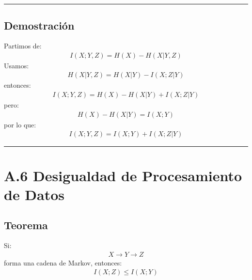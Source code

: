 \documentclass[letterpaper,10pt,english]{jupyterBook}
\begin{document}
\bigskip\hrule\bigskip



\subsection{Demostración}
\label{\detokenize{05_appendices/proofs:id8}}
\sphinxAtStartPar
Partimos de:
\begin{equation*}
\begin{split}
I(X;Y,Z)=H(X)-H(X|Y,Z)
\end{split}
\end{equation*}
\sphinxAtStartPar
Usamos:
\begin{equation*}
\begin{split}
H(X|Y,Z)=H(X|Y)-I(X;Z|Y)
\end{split}
\end{equation*}
\sphinxAtStartPar
entonces:
\begin{equation*}
\begin{split}
I(X;Y,Z)=
H(X)-H(X|Y)+I(X;Z|Y)
\end{split}
\end{equation*}
\sphinxAtStartPar
pero:
\begin{equation*}
\begin{split}
H(X)-H(X|Y)=I(X;Y)
\end{split}
\end{equation*}
\sphinxAtStartPar
por lo que:
\begin{equation*}
\begin{split}
I(X;Y,Z)=I(X;Y)+I(X;Z|Y)
\end{split}
\end{equation*}

\bigskip\hrule\bigskip



\section{A.6 Desigualdad de Procesamiento de Datos}
\label{\detokenize{05_appendices/proofs:a-6-desigualdad-de-procesamiento-de-datos}}

\subsection{Teorema}
\label{\detokenize{05_appendices/proofs:id9}}
\sphinxAtStartPar
Si:
\begin{equation*}
\begin{split}
X \rightarrow Y \rightarrow Z
\end{split}
\end{equation*}
\sphinxAtStartPar
forma una cadena de Markov, entonces:
\begin{equation*}
\begin{split}
I(X;Z)\le I(X;Y)
\end{split}
\end{equation*}
\end{document}
